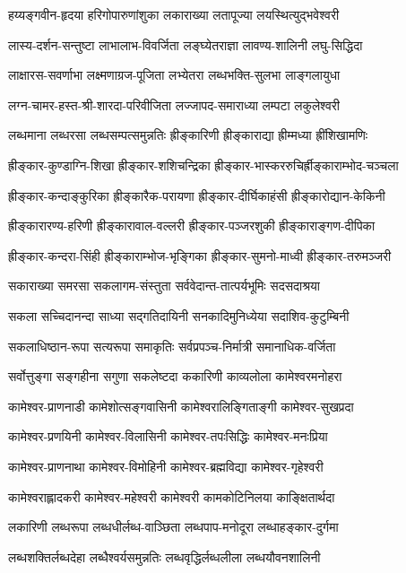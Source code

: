 \twolineshloka
{हय्यङ्गवीन-हृदया हरिगोपारुणांशुका}
{लकाराख्या लतापूज्या लयस्थित्युद्भवेश्वरी}

\twolineshloka
{लास्य-दर्शन-सन्तुष्टा लाभालाभ-विवर्जिता}
{लङ्घ्येतराज्ञा लावण्य-शालिनी लघु-सिद्धिदा}

\twolineshloka
{लाक्षारस-सवर्णाभा लक्ष्मणाग्रज-पूजिता}
{लभ्येतरा लब्धभक्ति-सुलभा लाङ्गलायुधा}

\twolineshloka
{लग्न-चामर-हस्त-श्री-शारदा-परिवीजिता}
{लज्जापद-समाराध्या लम्पटा लकुलेश्वरी}

\twolineshloka
{लब्धमाना लब्धरसा लब्धसम्पत्समुन्नतिः}
{ह्रीङ्कारिणी  ह्रीङ्काराद्या ह्रीम्मध्या ह्रींशिखामणिः}

\twolineshloka
{ह्रीङ्कार-कुण्डाग्नि-शिखा ह्रीङ्कार-शशिचन्द्रिका}
{ह्रीङ्कार-भास्कररुचिर्ह्रीङ्काराम्भोद-चञ्चला}

\twolineshloka
{ह्रीङ्कार-कन्दाङ्कुरिका ह्रीङ्कारैक-परायणा}
{ह्रीङ्कार-दीर्घिकाहंसी ह्रीङ्कारोद्यान-केकिनी}

\twolineshloka
{ह्रीङ्कारारण्य-हरिणी ह्रीङ्कारावाल-वल्लरी}
{ह्रीङ्कार-पञ्जरशुकी ह्रीङ्काराङ्गण-दीपिका}

\twolineshloka
{ह्रीङ्कार-कन्दरा-सिंही ह्रीङ्काराम्भोज-भृङ्गिका}
{ह्रीङ्कार-सुमनो-माध्वी ह्रीङ्कार-तरुमञ्जरी}

\twolineshloka
{सकाराख्या समरसा सकलागम-संस्तुता}
{सर्ववेदान्त-तात्पर्यभूमिः सदसदाश्रया}

\twolineshloka
{सकला सच्चिदानन्दा साध्या सद्गतिदायिनी}
{सनकादिमुनिध्येया सदाशिव-कुटुम्बिनी}

\twolineshloka
{सकलाधिष्ठान-रूपा सत्यरूपा समाकृतिः}
{सर्वप्रपञ्च-निर्मात्री समानाधिक-वर्जिता}

\twolineshloka
{सर्वोत्तुङ्गा सङ्गहीना सगुणा सकलेष्टदा}
{ककारिणी काव्यलोला कामेश्वरमनोहरा}

\twolineshloka
{कामेश्वर-प्राणनाडी कामेशोत्सङ्गवासिनी}
{कामेश्वरालिङ्गिताङ्गी कामेश्वर-सुखप्रदा}

\twolineshloka
{कामेश्वर-प्रणयिनी कामेश्वर-विलासिनी}
{कामेश्वर-तपःसिद्धिः कामेश्वर-मनःप्रिया}

\twolineshloka
{कामेश्वर-प्राणनाथा कामेश्वर-विमोहिनी}
{कामेश्वर-ब्रह्मविद्या कामेश्वर-गृहेश्वरी}

\twolineshloka
{कामेश्वराह्लादकरी कामेश्वर-महेश्वरी}
{कामेश्वरी कामकोटिनिलया काङ्क्षितार्थदा}

\twolineshloka
{लकारिणी लब्धरूपा लब्धधीर्लब्ध-वाञ्छिता}
{लब्धपाप-मनोदूरा लब्धाहङ्कार-दुर्गमा}

\twolineshloka
{लब्धशक्तिर्लब्धदेहा लब्धैश्वर्यसमुन्नतिः}
{लब्धवृद्धिर्लब्धलीला लब्धयौवनशालिनी}

